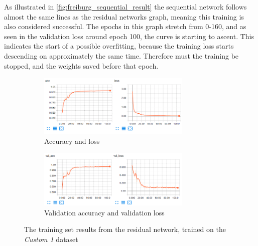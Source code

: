 \documentclass[USenglish]{ifimaster}  %
\begin{document}
As illustrated in \cref{fig:freiburg_sequential_result} the sequential network follows almost the same lines as the residual networks graph, meaning this training is also considered successful. The epochs in this graph stretch from 0-160, and as seen in the validation loss around epoch 100, the curve is starting to ascent. This indicates the start of a possible overfitting, because the training loss starts descending on approximately the same time. Therefore must the training be stopped, and the weights saved before that epoch. 

\begin{figure}[H]
\centering
\begin{subfigure}[b]{\textwidth}
\centering
\includegraphics[width=0.8\textwidth]{bilder/custom_1_training/Custom_1_residual_training_acc_results.png}
\caption{Accuracy and loss}
\label{fig:custom_1_residual_acc_result}
\end{subfigure}
\hfill
\begin{subfigure}[b]{\textwidth}
\centering
\includegraphics[width=0.8\textwidth]{bilder/custom_1_training/Custom_1_residual_training_val_acc_results.png}
\caption{Validation accuracy and validation loss}
\label{fig:custom_1_residual_val_acc_result}
\end{subfigure}
\caption{The training set results from the residual network, trained on the \textit{Custom 1} dataset}
\label{fig:custom_1_residual_result}
\end{figure}
\end{document}
